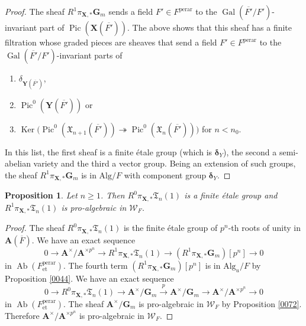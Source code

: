 \documentclass{amsart}
\newtheorem{Prop}[Thm]{Proposition}
\theoremstyle{remark}
\numberwithin{equation}{section}
\newcommand{\onto}{\twoheadrightarrow}
\newcommand{\closure}[1]{\overline{#1}}
\newcommand{\et}{\mathrm{et}}
\newcommand{\Gm}{\mathbf{G}_{m}}
\newcommand{\perar}{\mathrm{perar}}
\newcommand{\Alg}{\mathrm{Alg}}
\newcommand{\alg}[1]{\mathbf{#1}}
\newcommand{\varalg}[1]{\bm{#1}}
\DeclareMathOperator{\Gal}{Gal}
\DeclareMathOperator{\Ker}{Ker}
\DeclareMathOperator{\Ab}{Ab}
\DeclareMathOperator{\Pic}{Pic}
\begin{document}
\begin{proof}
	The sheaf $R^{1} \pi_{\alg{X}, \ast} \Gm$ sends a field $F' \in F^{\perar}$
	to the $\Gal(\closure{F'} / F')$-invariant part of $\Pic(\alg{X}(\closure{F'}))$.
	The above shows that this sheaf has a finite filtration whose graded pieces are
	sheaves that send a field $F' \in F^{\perar}$ to the $\Gal(\closure{F'} / F')$-invariant parts of
		\begin{enumerate}
			\item
				$\delta_{\alg{Y}(\closure{F'})}$,
			\item
				$\Pic^{0}(\alg{Y}(\closure{F'}))$ or
			\item
					$
						\Ker \bigl(
								\Pic^{0}(\varalg{\mathfrak{X}}_{n + 1}(\closure{F'}))
							\onto
							\Pic^{0}(\varalg{\mathfrak{X}}_{n}(\closure{F'}))
						\bigr)
					$
				for $n < n_{0}$.
		\end{enumerate}
	In this list, the first sheaf is a finite \'etale group (which is $\varalg{\delta}_{Y}$),
	the second a semi-abelian variety
	and the third a vector group.
	Being an extension of such groups,
	the sheaf $R^{1} \pi_{\alg{X}, \ast} \Gm$ is in $\Alg / F$
	with component group $\varalg{\delta}_{Y}$.
\end{proof}

\begin{Prop} \label{0045}
	Let $n \ge 1$.
	Then $R^{0} \pi_{\alg{X}, \ast} \mathfrak{T}_{n}(1)$ is a finite \'etale group and
	$R^{1} \pi_{\alg{X}, \ast} \mathfrak{T}_{n}(1)$ is pro-algebraic in $\mathcal{W}_{F}$.
\end{Prop}

\begin{proof}
	The sheaf $R^{0} \pi_{\alg{X}, \ast} \mathfrak{T}_{n}(1)$ is the finite \'etale group of
	$p^{n}$-th roots of unity in $\alg{A}(\closure{F})$.
	We have an exact sequence
		\[
				0
			\to
				\alg{A}^{\times} / \alg{A}^{\times p^{n}}
			\to
				R^{1} \pi_{\alg{X}, \ast} \mathfrak{T}_{n}(1)
			\to
				(R^{1} \pi_{\alg{X}, \ast} \Gm)[p^{n}]
			\to
				0
		\]
	in $\Ab(F^{\perar}_{\et})$.
	The fourth term $(R^{1} \pi_{\alg{X}, \ast} \Gm)[p^{n}]$ is in $\Alg_{u} / F$
	by Proposition \ref{0044}.
	We have an exact sequence
		\[
				0
			\to
				R^{0} \pi_{\alg{X}, \ast} \mathfrak{T}_{n}(1)
			\to
				\alg{A}^{\times} / \Gm
			\stackrel{p}{\to}
				\alg{A}^{\times} / \Gm
			\to
				\alg{A}^{\times} / \alg{A}^{\times p^{n}}
			\to
				0
		\]
	in $\Ab(F^{\perar}_{\et})$.
	The sheaf $\alg{A}^{\times} / \Gm$ is pro-algebraic in $\mathcal{W}_{F}$
	by Proposition \ref{0072}.
	Therefore $\alg{A}^{\times} / \alg{A}^{\times p^{n}}$ is pro-algebraic in $\mathcal{W}_{F}$.
\end{proof}
\end{document}
